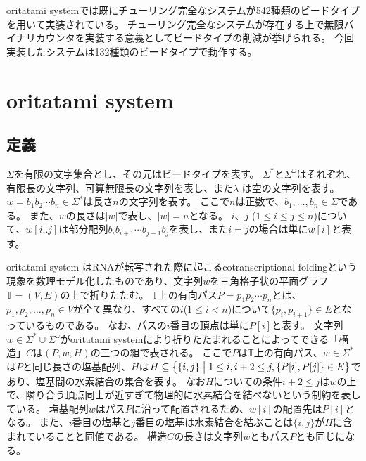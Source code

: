 \documentclass[a4,11pt]{article}
\begin{document}
oritatami systemでは既にチューリング完全なシステムが542種類のビードタイプを用いて実装されている\cite{GeMeScSe2018}。
チューリング完全なシステムが存在する上で無限バイナリカウンタを実装する意義としてビードタイプの削減が挙げられる。
今回実装したシステムは132種類のビードタイプで動作する。


\section{oritatami system}


\subsection{定義}
$\Sigma$を有限の文字集合とし、その元はビードタイプを表す。
$\Sigma^*$と$\Sigma^\omega$はそれぞれ、有限長の文字列、可算無限長の文字列を表し、また$\lambda$ は空の文字列を表す。
$w = b_1 b_2 \cdots b_n \in \Sigma^*$は長さ$n$の文字列を表す。
ここで$n$は正数で、$b_1, \ldots, b_n \in \Sigma$である。
また、$w$の長さは$|w|$で表し、$|w| = n$となる。
$i$、$j$ ($1 \le i \le j \le n$)について、$w[i..j]$は部分配列$b_i b_{i+1} \cdots b_{j-1} b_j$を表し、また$i=j$の場合は単に$w[i]$と表す。

oritatami system はRNAが転写された際に起こるcotranscriptional foldingという現象を数理モデル化したものであり、文字列$w$を三角格子状の平面グラフ$\mathbb{T} = (V, E)$の上で折りたたむ。
$\mathbb{T}$上の有向パス$P = p_1 p_2 \cdots p_n$とは、$p_1, p_2, \ldots, p_n \in V$が全て異なり、すべての$i $($1 \le i < n$)について$\{p_i, p_{i+1}\} \in E$となっているものである。
なお、パスの$i$番目の頂点は単に$P[i]$と表す。
文字列$w \in \Sigma^* \cup \Sigma^\omega$がoritatami systemにより折りたたまれることによってできる「構造」$C$は$(P, w, H)$の三つの組で表される。
ここで$P$は$\mathbb{T}$上の有向パス、$w \in \Sigma^*$は$P$と同じ長さの塩基配列、$H$は$H \subseteq \bigl\{\{i, j\} \bigm| 1 \le i, i+2 \le j, \{P[i], P[j]\} \in E \bigr\}$であり、塩基間の水素結合の集合を表す。
なお$H$についての条件$i+2 \le j$は$w$の上で、隣り合う頂点同士が近すぎて物理的に水素結合を結べないという制約を表している。
塩基配列$w$はパス$P$に沿って配置されるため、$w[i]$の配置先は$P[i]$となる。
また、$i$番目の塩基と$j$番目の塩基は水素結合を結ぶことは$\{i, j\}$が$H$に含まれていることと同値である。
構造$C$の長さは文字列$w$ともパス$P$とも同じになる。
\end{document}
